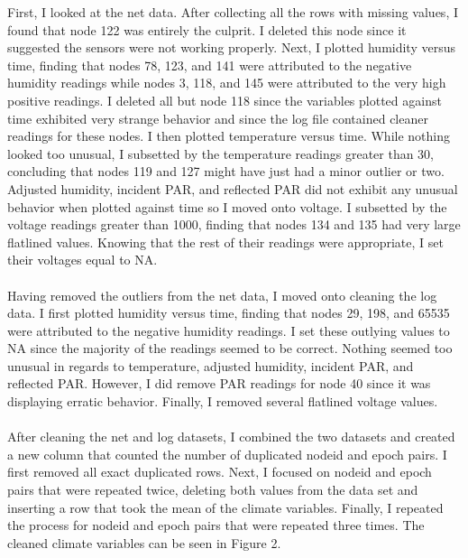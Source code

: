 \documentclass[11pt]{article}
\begin{document}
First, I looked at the net data. After collecting all the rows with missing values, I found that node 122 was entirely the culprit. I deleted this node since it suggested the sensors were not working properly. Next, I plotted humidity versus time, finding that nodes 78, 123, and 141 were attributed to the negative humidity readings while nodes 3, 118, and 145 were attributed to the very high positive readings. I deleted all but node 118 since the variables plotted against time exhibited very strange behavior and since the log file contained cleaner readings for these nodes. I then plotted temperature versus time. While nothing looked too unusual, I subsetted by the temperature readings greater than 30, concluding that nodes 119 and 127 might have just had a minor outlier or two. Adjusted humidity, incident PAR, and reflected PAR did not exhibit any unusual behavior when plotted against time so I moved onto voltage. I subsetted by the voltage readings greater than 1000, finding that nodes 134 and 135 had very large flatlined values. Knowing that the rest of their readings were appropriate, I set their voltages equal to NA.\\
\\
Having removed the outliers from the net data, I moved onto cleaning the log data. I first plotted humidity versus time, finding that nodes 29, 198, and 65535 were attributed to the negative humidity readings. I set these outlying values to NA since the majority of the readings seemed to be correct. Nothing seemed too unusual in regards to temperature, adjusted humidity, incident PAR, and reflected PAR. However, I did remove PAR readings for node 40 since it was displaying erratic behavior. Finally, I removed several flatlined voltage values.\\
\\
After cleaning the net and log datasets, I combined the two datasets and created a new column that counted the number of duplicated nodeid and epoch pairs. I first removed all exact duplicated rows. Next, I focused on nodeid and epoch pairs that were repeated twice, deleting both values from the data set and inserting a row that took the mean of the climate variables. Finally, I repeated the process for nodeid and epoch pairs that were repeated three times. The cleaned climate variables can be seen in Figure 2.  
\end{document}
